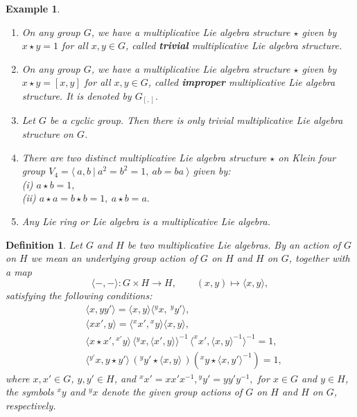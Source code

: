 \documentclass[10 pt,oneside,reqno,a4paper]{amsart}
\newtheorem{definition}{Definition}[section]
\newtheorem{example}[theorem]{Example}
\numberwithin{equation}{section}
\begin{document}
 \begin{example}\cite{RS, MS1}
        \begin{enumerate} 
 \item[1.] On any group $G$, we have a multiplicative Lie algebra structure $\star $ given by  $x \star y = 1$ for all $x, y \in G$, called \textbf{trivial} multiplicative Lie algebra structure.
		 
		\item[2.] On any group $G$, we have a multiplicative Lie algebra structure $\star$ given by  $x \star y = [x,y]$ for all $x, y \in G$, called \textbf{improper} multiplicative Lie algebra structure. It is denoted by $G_{[,]}.$
		
		\item[3.] Let $G$ be a cyclic group. Then there is only trivial multiplicative Lie algebra structure on $G$.
         \item[4.]  There are two distinct  multiplicative Lie algebra structure $\star$ on  Klein four group $V_4 =  \langle \ a, b  \ | \ a^2 = b^2 = 1,\ ab  = ba \ \rangle$ given by:\\
		(i) $a \star b = 1,$ \\
		(ii)  $ a \star a = b \star b = 1, \  a \star b = a.$
		\item[5.] Any Lie ring or Lie algebra is a multiplicative Lie algebra.
            \end{enumerate}
    \end{example} 

\begin{definition} \cite{GNM}
    Let $G$ and $H$ be two multiplicative Lie algebras. By an action of $G$ on $H$ we mean an underlying group action of $G$ on $H$ and $H$ on $G$, together with a map \[ \langle-,-\rangle:G\times H\longrightarrow H, \qquad (x,y)\longmapsto \langle x,y\rangle, \] satisfying the following conditions: \begin{align*} 
    &\langle x,yy'\rangle = \langle x,y\rangle \langle{}^{y}x,~ ^{y}y'\rangle, \\
    &\langle xx',y\rangle = \langle{}^{x}x',{}^{x}y\rangle \langle x,y\rangle, \\
    & \langle x\star x',{}^{x'}y\rangle\, \langle{}^{y}x,\langle x',y\rangle\rangle^{-1}\, \langle ^xx',\langle x,y\rangle^{-1}\rangle^{-1} =1, \\
   & \langle{}^{y'}x,y\star y'\rangle\, ({}^{y}y' \star \langle x,y\rangle\,) ({}^{x}y \star \langle x,y'\rangle^{-1}) =1,
    \end{align*}
    where $x,x'\in G$, $y,y'\in H$, and  ${}^{x}x'=xx'x^{-1}, {}^{y}y'=yy'y^{-1},$ for $x\in G$ and $y\in H$, the symbols ${}^{x}y$ and ${}^{y}x$ denote the given group actions of $G$ on $H$ and $H$ on $G$, respectively.
\end{definition}
\end{document}

